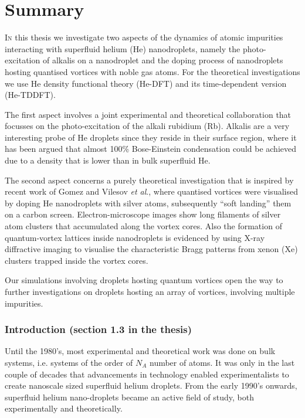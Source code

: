 \chapter{Summary} %
	\lettrine[lines=4]{\color{activeColor}I}{n} this thesis we investigate two aspects of the dynamics of atomic impurities interacting with superfluid helium (He) nanodroplets, namely the photo-excitation of alkalis on a nanodroplet and the doping process of nanodroplets hosting quantised vortices with noble gas atoms. For the theoretical investigations we use He density functional theory (He-DFT) and its time-dependent version (He-TDDFT).

	The first aspect involves a joint experimental and theoretical collaboration that focusses on the photo-excitation of the alkali rubidium (Rb). Alkalis are a very interesting probe of He droplets since they reside in their surface region, where it has been argued that almost 100\% Bose-Einstein condensation could be achieved due to a density that is lower than in bulk superfluid He.

	The second aspect concerns a purely theoretical investigation that is inspired by recent work of Gomez and Vilesov \emph{et al}., where quantised vortices were visualised by doping He nanodroplets with silver atoms, subsequently ``soft landing'' them on a carbon screen. Electron-microscope images show long filaments of silver atom clusters that accumulated along the vortex cores. Also the formation of quantum-vortex lattices inside nanodroplets is evidenced by using X-ray diffractive imaging to visualise the characteristic Bragg patterns from xenon (Xe) clusters trapped inside the vortex cores.

	Our simulations involving droplets hosting quantum vortices open the way to further investigations on droplets hosting an array of vortices, involving multiple impurities.
		
	\subsection*{Introduction (section 1.3 in the thesis)}
		Until the 1980's, most experimental and theoretical work was done on bulk systems, i.e. systems of the order of $N_A$ number of atoms. It was only in the last couple of decades that advancements in technology enabled experimentalists to create nanoscale sized superfluid helium droplets. From the early 1990's onwards, superfluid helium nano-droplets became an active field of study, both experimentally and theoretically. 
		
